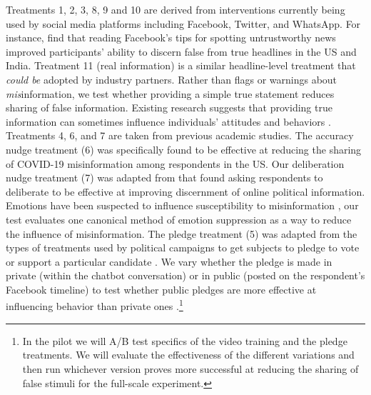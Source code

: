 \documentclass[letterpaper, 12pt, parskip=full,]{scrartcl}
\begin{document}
Treatments 1, 2, 3, 8, 9 and 10 are derived from interventions currently being used by social media platforms including Facebook, Twitter, and WhatsApp. For instance, \citet{guessetal2020digital} find that reading Facebook's tips for spotting untrustworthy news improved participants' ability to discern false from true headlines in the US and India. Treatment 11 (real information) is a similar headline-level treatment that \textit{could be} adopted by industry partners. Rather than flags or warnings about \textit{mis}information, we test whether providing a simple true statement reduces sharing of false information. Existing research suggests that providing true information can sometimes influence individuals' attitudes and behaviors \citep{gilens2001political}. %
Treatments 4, 6, and 7 are taken from previous academic studies. The accuracy nudge treatment (6) was specifically found to be effective at reducing the sharing of COVID-19 misinformation among respondents in the US. Our deliberation nudge treatment (7) was adapted from \citet{bago2020fake} that found asking respondents to deliberate to be effective at improving discernment of online political information. Emotions have been suspected to influence susceptibility to misinformation \citep{martel2019reliance}, our test evaluates one canonical method of emotion suppression as a way to reduce the influence of misinformation. The pledge treatment (5) was adapted from the types of treatments used by political campaigns to get subjects to pledge to vote or support a particular candidate \citep{costa2018walking}. %
We vary whether the pledge is made in private (within the chatbot conversation) or in public (posted on the respondent's Facebook timeline) to test whether public pledges are more effective at influencing behavior than private ones \citep{cotterill2013impact}.\footnote{In the pilot we will A/B test specifics of the video training and the pledge treatments. We will evaluate the effectiveness of the different variations and then run whichever version proves more successful at reducing the sharing of false stimuli for the full-scale experiment.}
\end{document}
